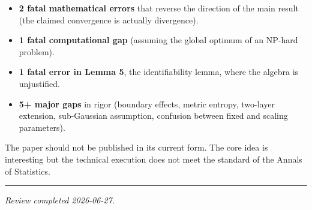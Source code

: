 \documentclass[
  12pt,
]{article}
\providecommand{\tightlist}{%
  \setlength{\itemsep}{0pt}\setlength{\parskip}{0pt}}
\begin{document}
\begin{itemize}
\tightlist
\item
  \textbf{2 fatal mathematical errors} that reverse the direction of the
  main result (the claimed convergence is actually divergence).
\item
  \textbf{1 fatal computational gap} (assuming the global optimum of an
  NP-hard problem).
\item
  \textbf{1 fatal error in Lemma 5}, the identifiability lemma, where
  the algebra is unjustified.
\item
  \textbf{5+ major gaps} in rigor (boundary effects, metric entropy,
  two-layer extension, sub-Gaussian assumption, confusion between fixed
  and scaling parameters).
\end{itemize}

The paper should not be published in its current form. The core idea is
interesting but the technical execution does not meet the standard of
the Annals of Statistics.

\begin{center}\rule{0.5\linewidth}{0.5pt}\end{center}

\emph{Review completed 2026-06-27.}
\end{document}
